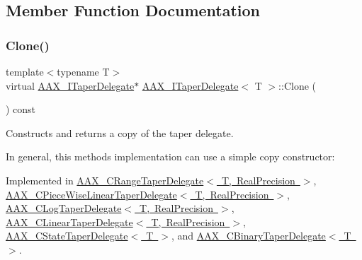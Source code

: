 \subsection{Member Function Documentation}
\mbox{\label{a01881_a80ce054ca716147155fe0682adf4e469}} 
\subsubsection{\texorpdfstring{Clone()}{Clone()}}
{\footnotesize\ttfamily template$<$typename T$>$ \\
virtual \mbox{\hyperlink{a01881}{A\+A\+X\+\_\+\+I\+Taper\+Delegate}}$\ast$ \mbox{\hyperlink{a01881}{A\+A\+X\+\_\+\+I\+Taper\+Delegate}}$<$ T $>$\+::Clone (\begin{DoxyParamCaption}{ }\end{DoxyParamCaption}) const\hspace{0.3cm}{\ttfamily [pure virtual]}}



Constructs and returns a copy of the taper delegate. 

In general, this method\textquotesingle{}s implementation can use a simple copy constructor\+:


\begin{DoxyCode}{0}
\DoxyCodeLine{\textcolor{keyword}{}\{}
\DoxyCodeLine{\}}
\end{DoxyCode}
 

Implemented in \mbox{\hyperlink{a01557_a787f7649ff4b94af1642bfa0198007a2}{A\+A\+X\+\_\+\+C\+Range\+Taper\+Delegate$<$ T, Real\+Precision $>$}}, \mbox{\hyperlink{a01553_ab8f9b4076d5d26f2fa8ce2ac34406241}{A\+A\+X\+\_\+\+C\+Piece\+Wise\+Linear\+Taper\+Delegate$<$ T, Real\+Precision $>$}}, \mbox{\hyperlink{a01497_afac51287c0ecb4490fb75064577d8292}{A\+A\+X\+\_\+\+C\+Log\+Taper\+Delegate$<$ T, Real\+Precision $>$}}, \mbox{\hyperlink{a01493_a022c70f963f1fb15238d21199d2d0ed9}{A\+A\+X\+\_\+\+C\+Linear\+Taper\+Delegate$<$ T, Real\+Precision $>$}}, \mbox{\hyperlink{a01569_a4a7f0c8d7a59a348d128a0bf750fea29}{A\+A\+X\+\_\+\+C\+State\+Taper\+Delegate$<$ T $>$}}, and \mbox{\hyperlink{a01457_a433b33f4b290fe03846b2044014ae994}{A\+A\+X\+\_\+\+C\+Binary\+Taper\+Delegate$<$ T $>$}}.



